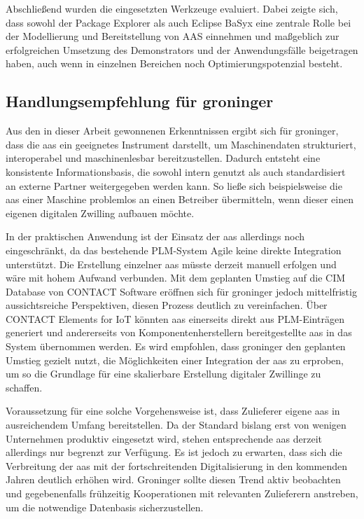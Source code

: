 Abschließend wurden die eingesetzten Werkzeuge evaluiert. 
Dabei zeigte sich, dass sowohl der Package Explorer als auch Eclipse BaSyx eine zentrale Rolle bei der Modellierung und Bereitstellung von AAS einnehmen und maßgeblich zur erfolgreichen Umsetzung des Demonstrators und der Anwendungsfälle beigetragen haben, auch wenn in einzelnen Bereichen noch Optimierungspotenzial besteht.

\newpage
\subsection{Handlungsempfehlung für groninger}

Aus den in dieser Arbeit gewonnenen Erkenntnissen ergibt sich für groninger, dass die \acs{aas} ein geeignetes Instrument darstellt, um Maschinendaten strukturiert, interoperabel und maschinenlesbar bereitzustellen. 
Dadurch entsteht eine konsistente Informationsbasis, die sowohl intern genutzt als auch standardisiert an externe Partner weitergegeben werden kann. 
So ließe sich beispielsweise die \acs{aas} einer Maschine problemlos an einen Betreiber übermitteln, wenn dieser einen eigenen digitalen Zwilling aufbauen möchte.

In der praktischen Anwendung ist der Einsatz der \acs{aas} allerdings noch eingeschränkt, da das bestehende PLM-System Agile keine direkte Integration unterstützt. 
Die Erstellung einzelner \acs{aas} müsste derzeit manuell erfolgen und wäre mit hohem Aufwand verbunden.
Mit dem geplanten Umstieg auf die CIM Database von CONTACT Software eröffnen sich für groninger jedoch mittelfristig aussichtsreiche Perspektiven, diesen Prozess deutlich zu vereinfachen. 
Über CONTACT Elements for IoT könnten \acs{aas} einerseits direkt aus PLM-Einträgen generiert und andererseits von Komponentenherstellern bereitgestellte \acs{aas} in das System übernommen werden. 
Es wird empfohlen, dass groninger den geplanten Umstieg gezielt nutzt, die Möglichkeiten einer Integration der \acs{aas} zu erproben, um so die Grundlage für eine skalierbare Erstellung digitaler Zwillinge zu schaffen.

Voraussetzung für eine solche Vorgehensweise ist, dass Zulieferer eigene \acs{aas} in ausreichendem Umfang bereitstellen. 
Da der Standard bislang erst von wenigen Unternehmen produktiv eingesetzt wird, stehen entsprechende \acs{aas} derzeit allerdings nur begrenzt zur Verfügung. 
Es ist jedoch zu erwarten, dass sich die Verbreitung der \acs{aas} mit der fortschreitenden Digitalisierung in den kommenden Jahren deutlich erhöhen wird. 
Groninger sollte diesen Trend aktiv beobachten und gegebenenfalls frühzeitig Kooperationen mit relevanten Zulieferern anstreben, um die notwendige Datenbasis sicherzustellen.

